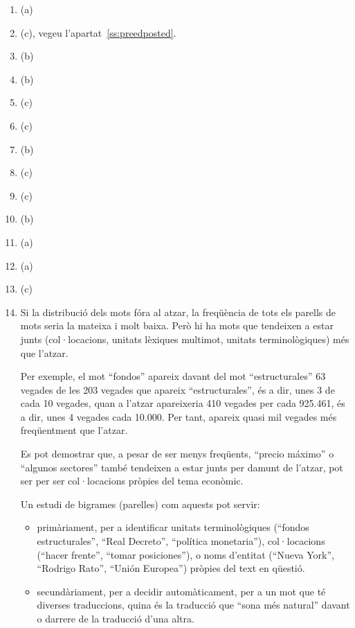 \begin{enumerate}
\item (a)
\item (c), vegeu l'apartat~\ref{ss:preedposted}.
\item (b)
\item (b)
\item (c)
\item (c)
\item (b)
\item (c)
\item (c)
\item (b)
\item (a)
\item (a)
\item (c)
\item Si la distribució dels mots fóra al atzar, la freqüència de tots
  els parells de mots seria la mateixa i molt baixa. Però hi ha mots
  que tendeixen a estar junts (col·locacions, unitats lèxiques
  multimot, unitats terminològiques) més que l'atzar.

  Per exemple, el mot ``fondos'' apareix davant del mot
  ``estructurales'' 63 vegades de les 203 vegades que apareix
  ``estructurales'', és a dir, unes 3 de cada 10 vegades, quan a
  l'atzar apareixeria 410 vegades per cada 925.461, és a dir, unes 4
  vegades cada 10.000. Per tant, apareix quasi mil vegades més
  freqüentment que l'atzar.

  Es pot demostrar que, a pesar de ser menys freqüents, ``precio
  máximo'' o ``algunos sectores'' també tendeixen a estar junts per
  damunt de l'atzar, pot ser per ser col·locacions pròpies del tema
  econòmic.

  Un estudi de bigrames (parelles) com aquests pot servir:

  \begin{itemize}
  \item primàriament, per a identificar unitats terminològiques
    (``fondos estructurales'', ``Real Decreto'', ``política
    monetaria''), col·locacions (``hacer frente'', ``tomar
    posiciones''), o noms d'entitat (``Nueva York'', ``Rodrigo Rato'',
    ``Unión Europea'') pròpies del text en qüestió.
   
  \item secundàriament, per a decidir automàticament, per a un mot que
    té diverses traduccions, quina és la traducció que ``sona més
    natural'' davant o darrere de la traducció d'una altra.
   \end{itemize}


\end{enumerate}
